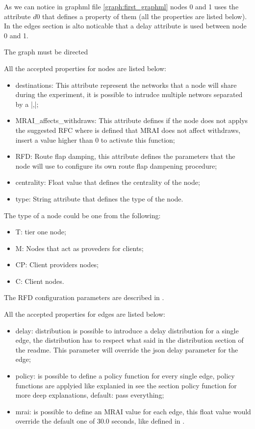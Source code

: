 \documentclass[10pt,journal,onecolumn]{IEEEtran}
\begin{document}
As we can notice in graphml file \ref{graph:first_graphml} nodes \num{0} and \num{1} uses the attribute $d0$ that
defines a property of them (all the properties are listed below).
In the edges section is alto noticable that a delay attribute is used between
node \num{0} and \num{1}.

The graph must be directed

All the accepted properties for nodes are listed below:
\begin{itemize}
		\item destinations:  This attribute represent the networks that a node will share 
			during the experiment, it is possible to intrudce multiple networs 
			separated by a |,|;
		\item MRAI\_affects\_withdraws: This attribute defines if the node does not 
			applys the suggested RFC  where is defined that
			MRAI does not affect withdraws, insert a value higher than \num{0} to
			activate this function;
		\item RFD: Route flap damping, this attribute defines the parameters
			that the node will use to configure its own route flap dampening
			procedure;
		\item centrality: Float value that defines the centrality of the node;
		\item type: String attribute that defines the type of the node.
\end{itemize}
The type of a node could be one from the following:
\begin{itemize}
		\item T: tier one node;
		\item M: Nodes that act as proveders for clients;
		\item CP: Client providers nodes;
		\item C: Client nodes.
\end{itemize}
The \ac{RFD} configuration parameters are described in .

All the accepted properties for edges are listed below:
\begin{itemize}
		\item delay: {distribution} is possible to introduce a delay distribution 
			for a single edge, the distribution has to respect what said in the 
			distribution section of the readme. This parameter will override the 
			json delay parameter for the edge;
		\item policy: is possible to define a policy function for every single edge, 
			policy functions are applyied like explanied in  
			see the section policy function for more deep explanations, default: pass everything;
		\item mrai: is possible to define an \ac{MRAI} value for each edge, this 
			float value would override the default one of
			30.0 seconds, like defined in .
\end{itemize}
\end{document}
